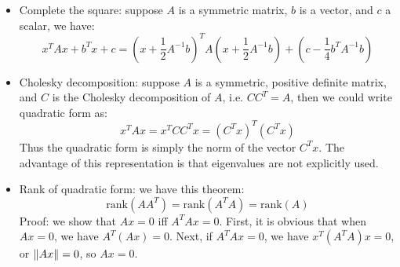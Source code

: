 \documentclass{report}
\begin{document}
\begin{itemize}
\item Complete the square: suppose $A$ is a symmetric matrix, $b$ is a vector, and $c$ a scalar, we have: 
\begin{equation}
x^T A x + b^T x + c	= \left(x + \frac{1}{2} A^{-1} b\right)^T A \left(x + \frac{1}{2} A^{-1} b\right) + (c - \frac{1}{4} b^T A^{-1} b)
\end{equation}

\item Cholesky decomposition: suppose $A$ is a symmetric, positive definite matrix, and $C$ is the Cholesky decomposition of $A$, i.e. $C C^T = A$, then we could write quadratic form as: 
\begin{equation}
x^T A x = x^T C C^T x = (C^T x)^T (C^T x)
\end{equation}
Thus the quadratic form is simply the norm of the vector $C^T x$. The advantage of this representation is that eigenvalues are not explicitly used. 

\item Rank of quadratic form: we have this theorem:
\begin{equation}
\text{rank}(AA^T) = \text{rank}(A^TA) = \text{rank}(A)
\end{equation}
Proof: we show that $Ax = 0$ iff $A^T A x = 0$. First, it is obvious that when $Ax = 0$, we have $A^T (Ax) = 0$. Next, if $A^T A x = 0$, we have $x^T (A^T A) x = 0$, or $\lVert Ax\rVert = 0$, so $Ax = 0$. 

\end{itemize}
\end{document}
